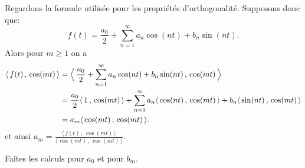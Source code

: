 Regardons la formule utilisée pour les propriétés d'orthogonalité. Supposons donc que:  
\begin{equation*}
f(t) = \frac{a_0}{2} + \sum_{n=1}^\infty a_n \cos (n t) + b_n
\sin (n t) .
\end{equation*}
Alors pour $m \geq 1$ on a
\begin{equation*}
\begin{split}
\langle \, f(t)\,,\,\cos (mt) \, \rangle
& =
\Bigl\langle \, \frac{a_0}{2} + \sum_{n=1}^\infty a_n \cos (n t) + b_n
\sin (n t) \,,\, \cos (mt) \, \Bigr\rangle \\
& =
\frac{a_0}{2}
\langle \, 1 \, , \, \cos (mt) \, \rangle
+ \sum_{n=1}^\infty
a_n \langle \, \cos (nt) \, , \, \cos (mt) \, \rangle +
b_n \langle \, \sin (n t) \, , \, \cos (mt) \, \rangle \\
& =
a_m \langle \, \cos (mt) \, , \, \cos (mt) \, \rangle .
\end{split}
\end{equation*}
et ainsi
$a_m =
\frac{\langle \, f(t) \, , \, \cos (mt) \, \rangle}{\langle \, \cos (mt) \, , \,
\cos (mt) \, \rangle}$.

\begin{exercise}
Faites les calculs pour $a_0$ et pour $b_m$.
\end{exercise}

